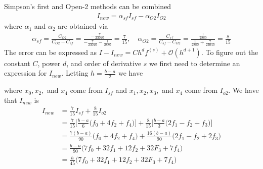 \documentclass[12pt]{article}
\theoremstyle{remark}
\begin{document}
Simpson's first and Open-2 methods can be combined
\begin{align}
I_{new} = \alpha_{sf}I_{sf} - \alpha_{O2}I_{O2}
\end{align} 
where $\alpha_1$ and $\alpha_2$ are obtained via
\begin{align*}
	\alpha_{sf} = \frac{C_{O2}}{C_{O2} - C_{sf}} = \frac{-\frac{7}{23040}}{-\frac{7}{23040} - \frac{1}{2880}} = \frac{7}{15}, \quad \alpha_{O2} = \frac{C_{sf}}{C_{sf} - C_{O2}} = \frac{\frac{1}{2880}}{\frac{1}{2880}+\frac{7}{23040}} = \frac{8}{15}
\end{align*}
The error can be expressed as $I - I_{new} = Ch^df^{(s)} + \mathcal{O}(h^{d+1})$. To figure out the constant $C$, power $d$, and order of derivative $s$ we first need to determine an expression for $I_{new}$. Letting $h = \frac{b-a}{2}$ we have
\begin{center}
\end{center}
where $x_0, x_2,$ and $x_4$ come from $I_{sf}$ and $x_1, x_2, x_3,$ and $x_4$ come from $I_{o2}$. We have that $I_{new}$ is
\begin{align*}
	I_{new} & = \frac{7}{15}I_{sf} + \frac{8}{15}I_{o2} 
	\\ & = \frac{7}{15}\bigg[\frac{b-a}{6}\bigg(f_0 + 4f_2 + f_4\bigg)\bigg] + \frac{8}{15}\bigg[\frac{b-a}{3}\bigg(2f_1 - f_2 + f_3\bigg)\bigg]
	\\ & = \frac{7(b-a)}{90}\bigg(f_0 + 4f_2 + f_4\bigg) + \frac{16(b-a)}{90}\bigg(2f_1 - f_2 + 2f_3\bigg)
	\\ & = \frac{b-a}{90}\bigg(7f_0 + 32f_1 + 12f_2 + 32F_3 + 7f_4\bigg)
	\\ & = \frac{h}{45}\bigg(7f_0 + 32f_1 + 12f_2 + 32F_3 + 7f_4\bigg)
\end{align*}
\end{document}
